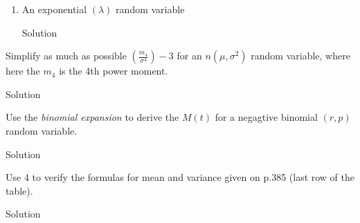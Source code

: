 \documentclass{article}
\begin{document}
\begin{spacing}{1.1}
\begin{homeworkProblem}
\begin{enumerate}[(1)]
\begin{homeworkSection}{Solution}
\begin{align*}
  | The derivative of p is zero:
= | (n-1) n p^2 (e^{2 t}  (p e^t-p+1)^{n-2}  (\frac{ d}{ dt} (2 t))+(n-2) p e^{3 t}  (p e^t-p+1)^{n-3} )+n p ((n-1) e^t (p e^t-0) (p e^t-p+1)^{n-2} +e^t (p e^t-p+1)^{n-1} )
  | Factor out constants:
= | (n-1) n p^2 (e^{2 t}  (p e^t-p+1)^{n-2}  (2 (\frac{ d}{ dt} (t)))+(n-2) p e^{3 t}  (p e^t-p+1)^{n-3} )+n p ((n-1) p e^{2 t}  (p e^t-p+1)^{n-2} +e^t (p e^t-p+1)^{n-1} )
  | The derivative of t is 1:
= | (n-1) n p^2 ((n-2) p e^{3 t}  (p e^t-p+1)^{n-3} +2 e^{2 t}  (p e^t-p+1)^{n-2} )+n p ((n-1) p e^{2 t}  (p e^t-p+1)^{n-2} +e^t (p e^t-p+1)^{n-1} )
            &= n p e^t (p (e^t - 1) + 1)^{n - 3} (p^2 (n^2 e^2t + (1 - 3 n) e^t + 1) 
            + p ((3n - 1) e^t -2) + 1)\\
          \text{Hence}\\
          M'''(0) &=
      \end{align*}
      \end{homeworkSection}
    \item An exponential $(\lambda)$ random variable
      \begin{homeworkSection}{Solution}
        
      \end{homeworkSection}
  \end{enumerate}
\end{homeworkProblem}

\newpage
\begin{homeworkProblem}
  Simplify as much as possible $\left(\frac{ m_4}{ \sigma^4}\right) - 3$ 
  for an $n(\mu, \sigma^2)$ random variable, where here the $m_4$ is the
  4th power moment.
  \begin{homeworkSection}{Solution}
    
  \end{homeworkSection}
\end{homeworkProblem}

\newpage
\begin{homeworkProblem}
  Use the \emph{binomial expansion} to derive the $M(t)$ for a negagtive
  binomial $(r, p)$ random variable.
  \begin{homeworkSection}{Solution}
    
  \end{homeworkSection}
\end{homeworkProblem}
\newpage
\begin{homeworkProblem}
  Use 4 to verify the formulas for mean and variance given on p.385 
  (last row of the table).
  \begin{homeworkSection}{Solution}
    
  \end{homeworkSection}
\end{homeworkProblem}
  
\end{spacing}
\end{document}
